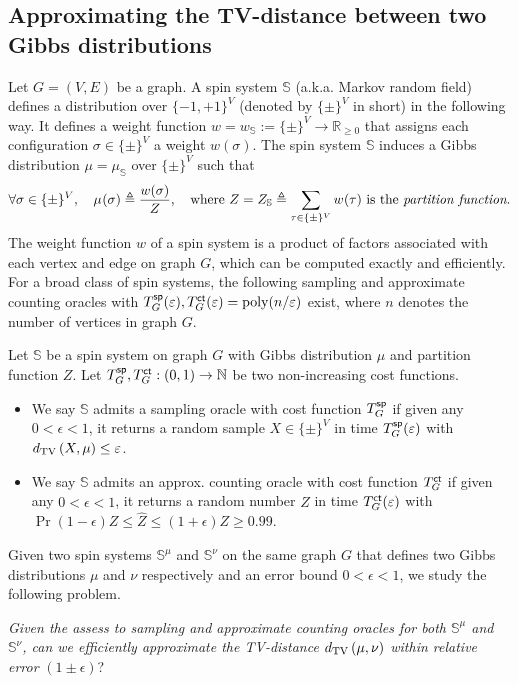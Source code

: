 \subsection{Approximating the TV-distance between two Gibbs distributions}
Let $G = (V,E)$ be a graph. A spin system $\mathbb{S}$ (a.k.a. Markov random field) defines a distribution over $\{-1,+1\}^V$ (denoted by $\{\pm\}^V$ in short) in the following way. It defines a weight function $w=w_{\mathbb{S}}:= \{\pm\}^V \to \mathbb{R}_{\geq 0}$ that assigns each configuration $\sigma \in \{\pm\}^V$ a weight $w(\sigma)$. The spin system $\mathbb{S}$ induces a Gibbs distribution $\mu = \mu_{\mathbb{S}}$ over $\{\pm\}^V$ such that
\begin{align*}
 \forall \sigma \in \{\pm\}^V,\quad   \mu_{}(\sigma) \triangleq \frac{w(\sigma)}{Z}, \quad \text{where } Z = Z_{\mathbb{S}} \triangleq \sum_{\tau \in \{\pm\}^V}w_{}(\tau) \text{ is the \emph{partition function}.}
\end{align*}
The weight function $w$ of a spin system is a product of factors associated with each vertex and edge on graph $G$, which can be computed exactly and efficiently.
For a broad class of spin systems, 
the following sampling and approximate counting oracles with $T^{\textsf{sp}}_G(\varepsilon),T^{\textsf{ct}}_G(\varepsilon) = \mathrm{poly}({n}/{\varepsilon})$ exist, where $n$ denotes the number of vertices in graph $G$. 
\begin{definition}\label{def:oracle}
Let $\mathbb{S}$ be a spin system on graph $G$ with Gibbs distribution $\mu$ and partition function $Z$.
Let $T^{\textsf{sp}}_G,T^{\textsf{ct}}_G:(0,1) \to \mathbb{N}$ be two non-increasing cost functions.
\begin{itemize}
    \item We say $\mathbb{S}$ admits a sampling oracle with cost function $T^{\textsf{sp}}_G$ if given any $0 <\epsilon<1$, it returns a random sample $X \in \{\pm\}^V$ in time $T^{\textsf{sp}}_G(\varepsilon)$ with $d_{\mathrm{TV}}\left({X},{\mu}\right) \leq \varepsilon$.
    \item We say $\mathbb{S}$ admits an approx. counting oracle with cost function $T^{\textsf{ct}}_G$ if given any $0 <\epsilon<1$, it returns a random number $\hat{Z}$ in time $T^{\textsf{ct}}_G(\varepsilon)$ with $\Pr{(1-\epsilon)Z\leq\hat{Z}\leq (1+\epsilon)Z}\geq 0.99$.
\end{itemize}
%
\end{definition}

Given two spin systems $\mathbb{S}^\mu$ and $\mathbb{S}^\nu$ on the same graph $G$ that defines two Gibbs distributions $\mu$ and $\nu$ respectively and an error bound $0 <\epsilon < 1$, we study the following problem.
\begin{center}
\emph{Given the assess to sampling and approximate counting oracles for both $\mathbb{S}^\mu$ and $\mathbb{S}^\nu$, can we efficiently approximate the TV-distance $d_{\mathrm{TV}}\left({\mu},{\nu}\right)$ within relative error }$(1\pm \epsilon)$?
\end{center}


